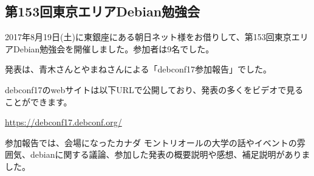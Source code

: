 \documentclass[mingoth,a4paper]{jsarticle}
\begin{document}

\subsection{第153回東京エリアDebian勉強会}

2017年8月19日(土)に東銀座にある朝日ネット様をお借りして、第153回東京エリアDebian勉強会を開催しました。参加者は9名でした。

発表は、青木さんとやまねさんによる「debconf17参加報告」でした。

debconf17のwebサイトは以下URLで公開しており、発表の多くをビデオで見ることができます。

\url{https://debconf17.debconf.org/}

参加報告では、会場になったカナダ モントリオールの大学の話やイベントの雰囲気、debianに関する議論、参加した発表の概要説明や感想、補足説明がありました。
\end{document}
